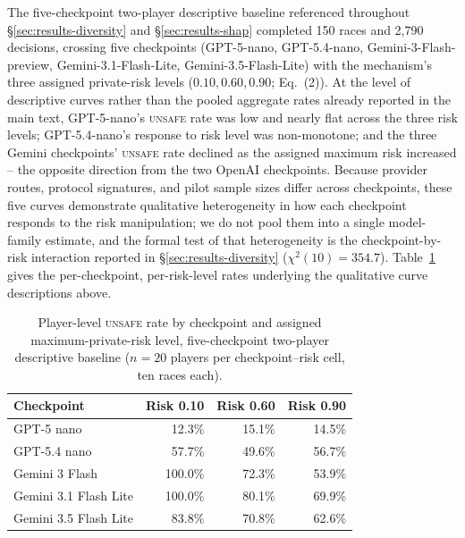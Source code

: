 \documentclass[sigconf]{aamas}
\newcommand{\Unsafe}{\textsc{unsafe}}
\begin{document}
The five-checkpoint two-player descriptive baseline referenced throughout
\S\ref{sec:results-diversity} and \S\ref{sec:results-shap} completed 150
races and 2{,}790 decisions, crossing five checkpoints (GPT-5-nano,
GPT-5.4-nano, Gemini-3-Flash-preview, Gemini-3.1-Flash-Lite,
Gemini-3.5-Flash-Lite) with the mechanism's three assigned private-risk
levels ($0.10,0.60,0.90$; Eq.~(2)). At the level of
descriptive curves rather than the pooled aggregate rates already reported
in the main text, GPT-5-nano's \Unsafe{} rate was low and nearly flat
across the three risk levels; GPT-5.4-nano's response to risk level was
non-monotone; and the three Gemini checkpoints' \Unsafe{} rate declined as
the assigned maximum risk increased -- the opposite direction from the two
OpenAI checkpoints. Because provider routes, protocol signatures, and pilot
sample sizes differ across checkpoints, these five curves demonstrate
qualitative heterogeneity in how each checkpoint responds to the risk
manipulation; we do not pool them into a single model-family estimate, and
the formal test of that heterogeneity is the checkpoint-by-risk interaction
reported in \S\ref{sec:results-diversity} ($\chi^2(10)=354.7$).
Table~\ref{tab:twoplayer-baseline-full} gives the per-checkpoint,
per-risk-level rates underlying the qualitative curve descriptions above.

\begin{table}[h]
    \caption{Player-level \Unsafe{} rate by checkpoint and assigned
    maximum-private-risk level, five-checkpoint two-player descriptive
    baseline ($n=20$ players per checkpoint--risk cell, ten races each).}
    \label{tab:twoplayer-baseline-full}
    \centering
    \small
    \begin{tabular}{@{}lrrr@{}}
        \toprule
        Checkpoint & Risk 0.10 & Risk 0.60 & Risk 0.90 \\
        \midrule
        GPT-5 nano             & 12.3\%  & 15.1\%  & 14.5\% \\
        GPT-5.4 nano            & 57.7\%  & 49.6\%  & 56.7\% \\
        Gemini 3 Flash          & 100.0\% & 72.3\%  & 53.9\% \\
        Gemini 3.1 Flash Lite   & 100.0\% & 80.1\%  & 69.9\% \\
        Gemini 3.5 Flash Lite   & 83.8\%  & 70.8\%  & 62.6\% \\
        \bottomrule
    \end{tabular}
\end{table}
\end{document}
